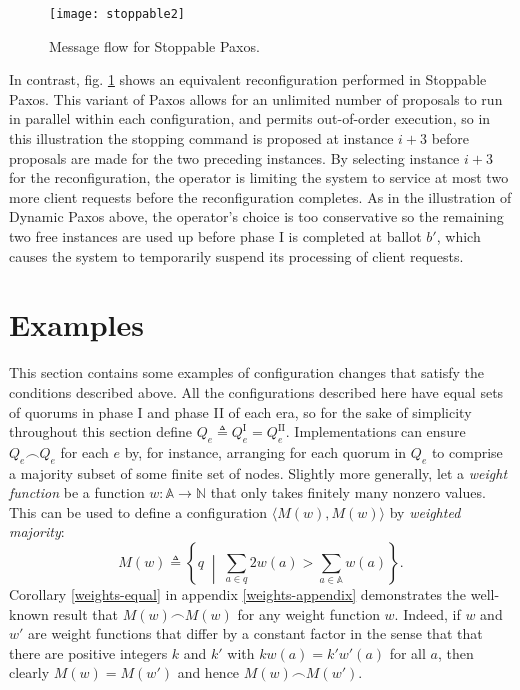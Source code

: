 \documentclass[journal]{IEEEtran}
\begin{document}
\begin{figure}[!t]
\centering
\texttt{[image: stoppable2]}
\caption{Message flow for Stoppable Paxos. \label{seq-diag-stoppable-ooo}}
\end{figure}

In contrast, fig. \ref{seq-diag-stoppable-ooo} shows an equivalent
reconfiguration performed in Stoppable Paxos. This variant of Paxos allows for
an unlimited number of proposals to run in parallel within each configuration,
and permits out-of-order execution, so in this illustration the stopping
command is proposed at instance $i+3$ before proposals are made for the two
preceding instances.  By selecting instance $i+3$ for the reconfiguration, the
operator is limiting the system to service at most two more client requests
before the reconfiguration completes. As in the illustration of Dynamic Paxos
above, the operator's choice is too conservative so the remaining two free
instances are used up before phase I is completed at ballot $b'$, which causes
the system to temporarily suspend its processing of client requests.

\section{Examples}\label{examples}

This section contains some examples of configuration changes that satisfy the
conditions described above.  All the configurations described here have equal
sets of quorums in phase I and phase II of each era, so for the sake of
simplicity throughout this section define ${Q_e \triangleq Q^\textrm{I}_e =
Q^\textrm{II}_e}$.  Implementations can ensure $Q_e \frown Q_e$ for each $e$
by, for instance, arranging for each quorum in $Q_e$ to comprise a majority
subset of some finite set of nodes. Slightly more generally, let a
\textit{weight function} be a function $w : \mathbb A \to \mathbb N$ that only
takes finitely many nonzero values. This can be used to define a configuration
$\langle M(w), M(w) \rangle$ by \textit{weighted majority}: \[M(w) \triangleq
  \left\{ q \;\middle|\; \sum_{a \in q} 2 w(a) > \sum_{a \in \mathbb A} w(a)
\right\}.\] Corollary \ref{weights-equal} in appendix \ref{weights-appendix}
demonstrates the well-known result that $M(w) \frown M(w)$ for any weight
function $w$.  Indeed, if $w$ and $w'$ are weight functions that differ by a
constant factor in the sense that that there are positive integers $k$ and $k'$
with $k w(a) = k' w'(a)$ for all $a$, then clearly ${M(w) = M(w')}$ and hence
$M(w) \frown M(w')$.
\end{document}

